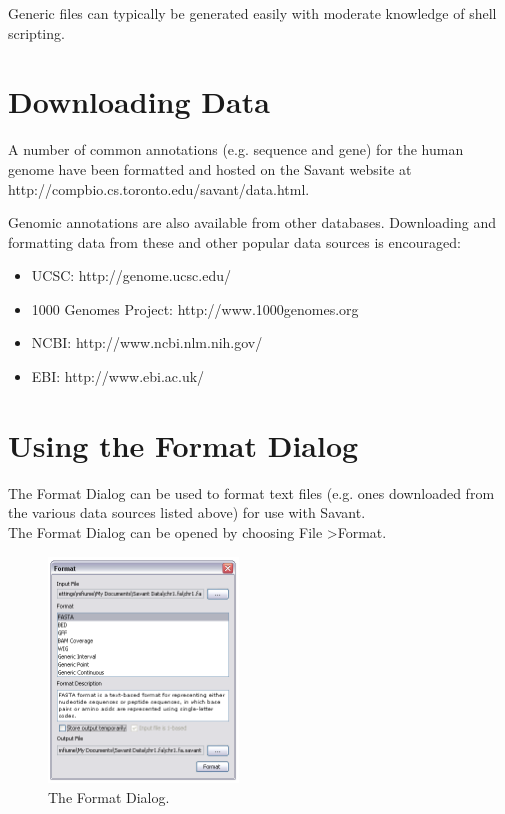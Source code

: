 \documentclass{report}
\begin{document}
Generic files can typically be generated easily with moderate knowledge of shell scripting.  

\section{Downloading Data}

A number of common annotations (e.g. sequence and gene) for the human genome have been formatted and hosted on the Savant website at http://compbio.cs.toronto.edu/savant/data.html.

Genomic annotations are also available from other databases. Downloading and formatting data from these and other popular data sources is encouraged:

\begin{itemize}
\item UCSC: http://genome.ucsc.edu/
\item 1000 Genomes Project: http://www.1000genomes.org
\item NCBI: http://www.ncbi.nlm.nih.gov/
\item EBI: http://www.ebi.ac.uk/
\end{itemize}

\section{Using the Format Dialog}

\label{usingformatdialog}

The Format Dialog can be used to format text files (e.g. ones downloaded from the various data sources listed above) for use with Savant. \\

The Format Dialog can be opened by choosing File \textgreater Format. \\

\begin{figure}[!h]
\begin{center}
\includegraphics[type=png,ext=.png,read=.png,height=6cm]{images/formatdialog}
\caption{The Format Dialog.}
\label{formatdialog}
\end{center}
\end{figure}
\end{document}
